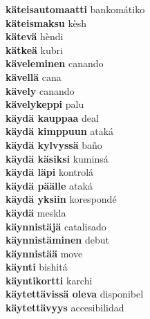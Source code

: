 \textbf{ käteisautomaatti  } bankomátiko \\
\textbf{ käteismaksu  } kèsh \\
\textbf{ kätevä  } hèndi \\
\textbf{ kätkeä  } kubri \\
\textbf{ käveleminen  } canando \\
\textbf{ kävellä  } cana \\
\textbf{ kävely  } canando \\
\textbf{ kävelykeppi  } palu \\
\textbf{ käydä kauppaa  } deal \\
\textbf{ käydä kimppuun  } ataká \\
\textbf{ käydä kylvyssä  } baño \\
\textbf{ käydä käsiksi  } kuminsá \\
\textbf{ käydä läpi  } kontrolá \\
\textbf{ käydä päälle  } ataká \\
\textbf{ käydä yksiin  } korespondé \\
\textbf{ käydä  } meskla \\
\textbf{ käynnistäjä  } catalisado \\
\textbf{ käynnistäminen  } debut \\
\textbf{ käynnistää  } move \\
\textbf{ käynti  } bishitá \\
\textbf{ käyntikortti  } karchi \\
\textbf{ käytettävissä oleva  } disponibel \\
\textbf{ käytettävyys  } accesibilidad \\
